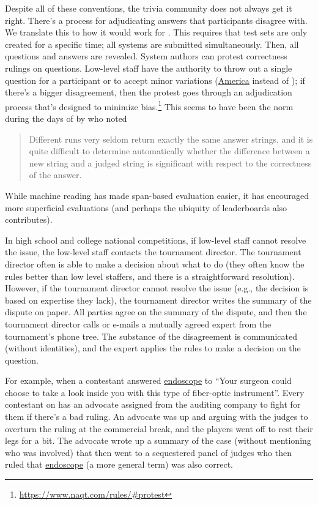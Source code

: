 Despite all of these conventions, the trivia community does not always get it right.
There's a process for adjudicating answers that participants disagree
with.  
We translate this to how it would work for .
This requires that test sets are only created for a specific time; all
systems are submitted simultaneously.
Then, all questions and answers are revealed.
System authors can protest correctness rulings on questions.
Low-level staff have the authority to throw out a single question for
a participant or to accept minor variations (\underline{America} instead
of \underline{}); if there's a bigger disagreement, then the protest goes
through an adjudication process that's designed to minimize
bias.\footnote{\url{https://www.naqt.com/rules/\#protest}}  
This seems to have been the norm during the days of  by  who noted
\begin{quote}
    Different  runs very seldom return exactly the same answer strings, and it is quite difficult to determine automatically whether the difference between a new string and a judged string is significant with respect to the correctness of the answer.
\end{quote} 
While machine reading has made span-based evaluation easier, it has encouraged more superficial evaluations (and perhaps the ubiquity of leaderboards also contributes).

In high school and college national competitions, if low-level staff cannot resolve the issue, the low-level staff contacts the tournament director.
The tournament director often is able to make a decision about what to do (they often know the rules better than low level staffers, and there is a straightforward resolution).
However, if the tournament director cannot resolve the issue (e.g., the decision is based on expertise they lack), the tournament director writes the summary of the dispute on paper.
All parties agree on the summary of the dispute, and then the tournament director calls or e-mails a mutually agreed expert from the tournament's phone tree.
The substance of the disagreement is communicated (without identities), and the expert applies the rules to make a decision on the question.

For example, when a 
\jeopardy{} contestant answered \underline{endoscope} to ``Your surgeon could choose to take a look inside you with this type of fiber-optic instrument''.
Every contestant on \jeopardy{} has an advocate assigned from the
auditing company to fight for them if there's a bad ruling.
An advocate was up and arguing with the
judges to overturn the ruling at the commercial break, and the players went off to rest their legs for a bit.
The advocate wrote up a summary of the case (without mentioning who was
involved) that then went to a sequestered panel of judges who then
ruled that \underline{endoscope} (a more general term) was also correct.

